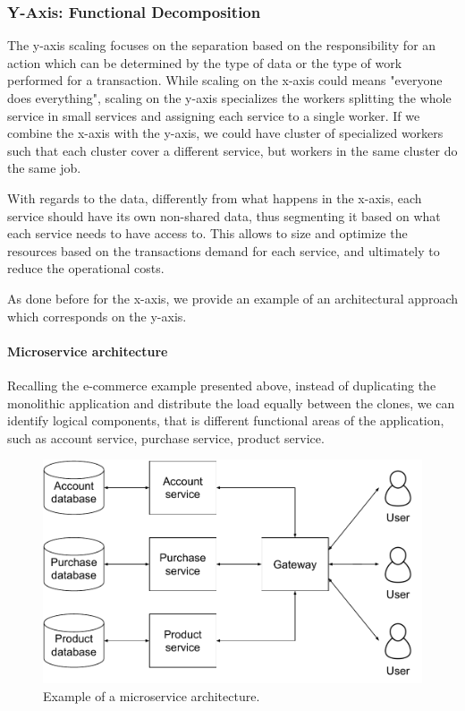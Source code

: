 \subsubsection{Y-Axis: Functional Decomposition}

The y-axis scaling focuses on the separation based on the responsibility for an
action which can be determined by the type of data or the type of work performed
for a transaction. While scaling on the x-axis could means "everyone does
everything", scaling on the y-axis specializes the workers splitting the whole
service in small services and assigning each service to a single worker. If we
combine the x-axis with the y-axis, we could have cluster of specialized workers
such that each cluster cover a different service, but workers in the same
cluster do the same job.

With regards to the data, differently from what happens in the x-axis, each
service should have its own non-shared data, thus segmenting it based on what
each service needs to have access to. This allows to size and optimize the
resources based on the transactions demand for each service, and ultimately to
reduce the operational costs.

As done before for the x-axis, we provide an example of an architectural
approach which corresponds on the y-axis.

\paragraph{Microservice architecture}
Recalling the e-commerce example presented above, instead of duplicating the
monolithic application and distribute the load equally between the clones, we
can identify logical components, that is different functional areas of the
application, such as account service, purchase service, product service.

\begin{figure}
	\begin{center}
		\includegraphics[width=.7\textwidth]{./res/img/microservice-architecture.pdf}
	\end{center}
	\caption{Example of a microservice architecture.}
	\label{fig:microservice-architecture}
\end{figure}

